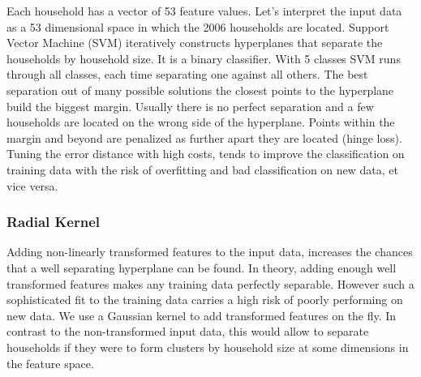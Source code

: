 \documentclass[]{article}
\newenvironment{Shaded}{\begin{snugshade}}{\end{snugshade}}
\newcommand{\DataTypeTok}[1]{\textcolor[rgb]{0.13,0.29,0.53}{#1}}
\newcommand{\DecValTok}[1]{\textcolor[rgb]{0.00,0.00,0.81}{#1}}
\newcommand{\FloatTok}[1]{\textcolor[rgb]{0.00,0.00,0.81}{#1}}
\newcommand{\KeywordTok}[1]{\textcolor[rgb]{0.13,0.29,0.53}{\textbf{#1}}}
\newcommand{\NormalTok}[1]{#1}
\newcommand{\OperatorTok}[1]{\textcolor[rgb]{0.81,0.36,0.00}{\textbf{#1}}}
\newcommand{\StringTok}[1]{\textcolor[rgb]{0.31,0.60,0.02}{#1}}
\begin{document}
Each household has a vector of 53 feature values. Let's interpret the
input data as a 53 dimensional space in which the 2006 households are
located. Support Vector Machine (SVM) iteratively constructs hyperplanes
that separate the households by household size. It is a binary
classifier. With 5 classes SVM runs through all classes, each time
separating one against all others. The best separation out of many
possible solutions the closest points to the hyperplane build the
biggest margin. Usually there is no perfect separation and a few
households are located on the wrong side of the hyperplane. Points
within the margin and beyond are penalized as further apart they are
located (hinge loss). Tuning the error distance with high costs, tends
to improve the classification on training data with the risk of
overfitting and bad classification on new data, et vice versa.

\begin{Shaded}
\end{Shaded}

\hypertarget{radial-kernel}{%
\subsubsection{Radial Kernel}\label{radial-kernel}}

Adding non-linearly transformed features to the input data, increases
the chances that a well separating hyperplane can be found. In theory,
adding enough well transformed features makes any training data
perfectly separable. However such a sophisticated fit to the training
data carries a high risk of poorly performing on new data. We use a
Gaussian kernel to add transformed features on the fly. In contrast to
the non-transformed input data, this would allow to separate households
if they were to form clusters by household size at some dimensions in
the feature space.

\begin{Shaded}
\end{Shaded}
\end{document}
